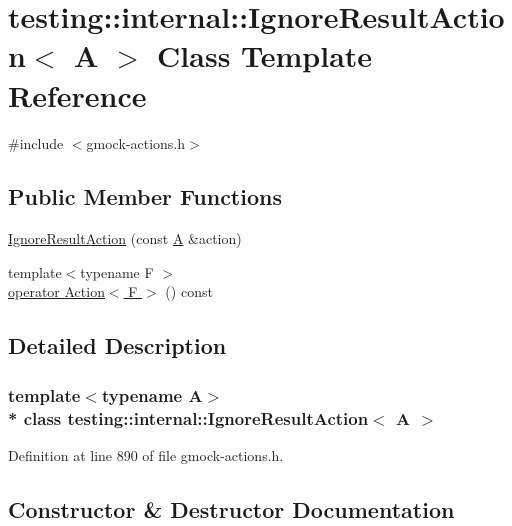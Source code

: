 \hypertarget{classtesting_1_1internal_1_1_ignore_result_action}{}\section{testing\+:\+:internal\+:\+:Ignore\+Result\+Action$<$ A $>$ Class Template Reference}
\label{classtesting_1_1internal_1_1_ignore_result_action}


{\ttfamily \#include $<$gmock-\/actions.\+h$>$}

\subsection*{Public Member Functions}
\begin{DoxyCompactItemize}
\item 
\hyperlink{classtesting_1_1internal_1_1_ignore_result_action_a9199f7b1b7771b2e2a5fd28caf624623}{Ignore\+Result\+Action} (const \hyperlink{namespacetesting_a5e9134d655d2fc9323902348083282e7}{A} \&action)
\item 
{\footnotesize template$<$typename F $>$ }\\\hyperlink{classtesting_1_1internal_1_1_ignore_result_action_a95b6a067a3b2fa43ab229b695f5cb4d2}{operator Action$<$ F $>$} () const 
\end{DoxyCompactItemize}


\subsection{Detailed Description}
\subsubsection*{template$<$typename A$>$\\*
class testing\+::internal\+::\+Ignore\+Result\+Action$<$ A $>$}



Definition at line 890 of file gmock-\/actions.\+h.



\subsection{Constructor \& Destructor Documentation}
